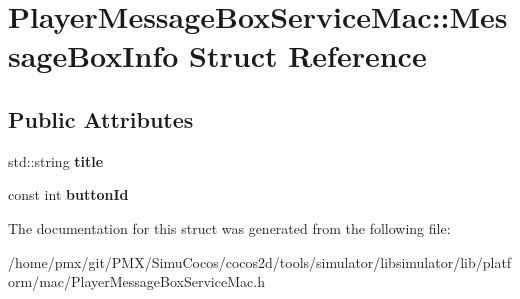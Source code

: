 \hypertarget{structPlayerMessageBoxServiceMac_1_1MessageBoxInfo}{}\section{Player\+Message\+Box\+Service\+Mac\+:\+:Message\+Box\+Info Struct Reference}
\label{structPlayerMessageBoxServiceMac_1_1MessageBoxInfo}
\subsection*{Public Attributes}
\begin{DoxyCompactItemize}
\item 
\mbox{\label{structPlayerMessageBoxServiceMac_1_1MessageBoxInfo_a9b6537b9c6b63b0e9e62813e29c06f36}} 
std\+::string {\bfseries title}
\item 
\mbox{\label{structPlayerMessageBoxServiceMac_1_1MessageBoxInfo_ab5c8a9cad3ebdc4e9a317e9caddfff67}} 
const int {\bfseries button\+Id}
\end{DoxyCompactItemize}


The documentation for this struct was generated from the following file\+:\begin{DoxyCompactItemize}
\item 
/home/pmx/git/\+P\+M\+X/\+Simu\+Cocos/cocos2d/tools/simulator/libsimulator/lib/platform/mac/Player\+Message\+Box\+Service\+Mac.\+h\end{DoxyCompactItemize}
